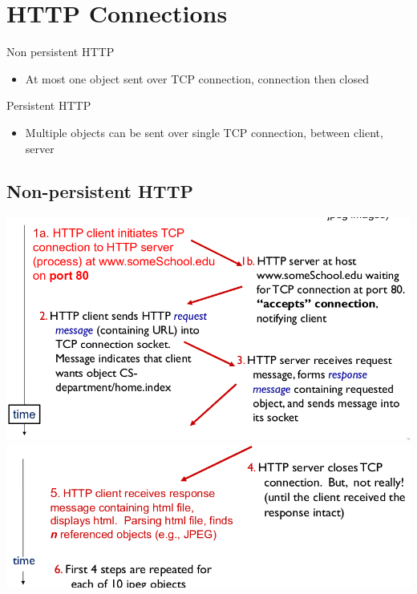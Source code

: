 \documentclass{article}[18pt]
\begin{document}
\section{HTTP Connections}
Non persistent HTTP
\begin{itemize}
	\item At most one object sent over TCP connection, connection then closed
\end{itemize}
Persistent HTTP
\begin{itemize}
	\item Multiple objects can be sent over single TCP connection, between client, server
\end{itemize}
\subsection{Non-persistent HTTP}
\includegraphics[scale=0.7]{HTTP}\\
\includegraphics[scale=0.7]{HTTP2}
\end{document}
